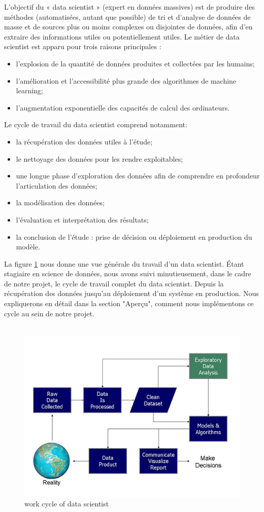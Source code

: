 \documentclass[12pt, french]{article}
\begin{document}
L'objectif du « data scientist » (expert en données massives) est de produire des méthodes (automatisées, autant que possible) de tri et d'analyse de données de masse et de sources plus ou moins complexes ou disjointes de données, afin d'en extraire des informations utiles ou potentiellement utiles. 
Le métier de data scientist est apparu pour trois raisons principales :	
\begin{itemize}
\item l'explosion de la quantité de données produites et collectées par les humains;
\item 	l'amélioration et l'accessibilité plus grande des algorithmes de machine learning;
\item l'augmentation exponentielle des capacités de calcul des ordinateurs.\\
\end{itemize}	
Le cycle de travail du data scientist comprend notamment:
\begin{itemize}
\item la récupération des données utiles à l'étude;
\item le nettoyage des données pour les rendre exploitables;
\item une longue phase d'exploration des données afin de comprendre en profondeur l'articulation des données;
\item la modélisation des données;
\item l'évaluation et interprétation des résultats;
\item  la conclusion de l'étude : prise de décision ou déploiement en production du modèle.
\end{itemize}
La figure \ref{workflow_datascientis} nous donne une vue générale du travail d'un data scientist. Étant stagiaire en science de données, nous avons suivi minutieusement, dans le cadre de notre projet, le cycle de travail complet du data scientist. Depuis la récupération des données jusqu'au déploiement d'un système en production. Nous expliquerons en détail dans la section "Aperçu", comment nous implémentons ce cycle au sein de notre projet. \\ \\
\begin{figure}[h]
\includegraphics[]{images/workflow_datascientis.png}
\caption{work cycle of data scientist}
\label{workflow_datascientis}
\end{figure}
\end{document}
